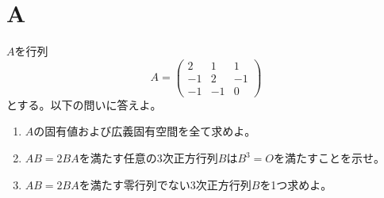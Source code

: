 \documentclass[report]{jlreq}
\begin{document}
%
\section{A}

\begin{problem}[第1問]
    $A$を行列
    \begin{equation}
        A =
            \begin{pmatrix}
                2 & 1 & 1 \\
                -1 & 2 & -1 \\
                -1 & -1 & 0
            \end{pmatrix}
    \end{equation}
    とする。以下の問いに答えよ。
    \begin{enumerate}
        \item $A$の固有値および広義固有空間を全て求めよ。
        \item $AB = 2BA$を満たす任意の3次正方行列$B$は$B^3 = O$を満たすことを示せ。
        \item $AB = 2BA$を満たす零行列でない3次正方行列$B$を1つ求めよ。
    \end{enumerate}
\end{problem}
\end{document}
